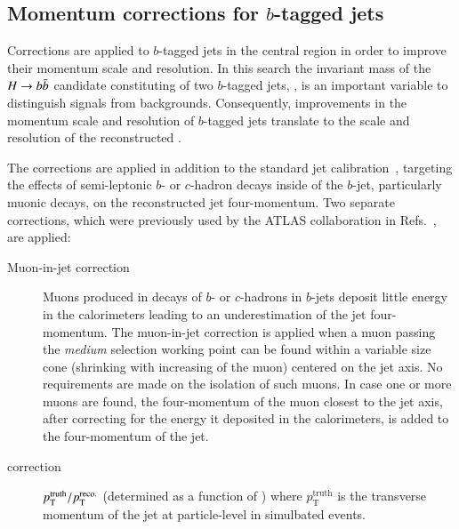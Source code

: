 

\subsection{Momentum corrections for $b$-tagged jets}
\label{sec:bjet_momentum_corrections}

Corrections are applied to $b$-tagged jets in the central region in
order to improve their momentum scale and resolution. In this search
the invariant mass of the $H \to b\bar{b}$ candidate constituting of two
$b$-tagged jets, \mBB, is an important variable to distinguish signals
from backgrounds. Consequently, improvements in the momentum scale and
resolution of $b$-tagged jets translate to the scale and resolution of
the reconstructed \mBB.

The corrections are applied in addition to the standard jet
calibration~\cite{JETM-2018-05}, targeting the effects of
semi-leptonic $b$- or $c$-hadron decays inside of the $b$-jet,
particularly muonic decays, on the reconstructed jet
four-momentum. Two separate corrections, which were
previously used by the ATLAS collaboration in
Refs.~\cite{HIGG-2016-29,HIGG-2018-04,HIGG-2018-51}, are applied:
\begin{description}

\item[Muon-in-jet correction] Muons produced in decays of $b$- or
  $c$-hadrons in $b$-jets deposit little energy in the calorimeters
  leading to an underestimation of the jet four-momentum. The
  muon-in-jet correction is applied when a muon passing the
  \emph{medium} selection working point can be found within a variable
  size cone (shrinking with increasing \pT of the muon) centered on
  the jet axis. No requirements are made on the isolation of such
  muons. In case one or more muons are found, the four-momentum of the
  muon closest to the jet axis, after correcting for the energy it
  deposited in the calorimeters, is added to the four-momentum of the
  jet.

\item[\pTreco correction] $p_{\text{T}}^{\text{truth}} / p_{\text{T}}^{\text{reco.}}$
  (determined as a function of \pTreco) where
  $p_{\text{T}}^{\text{truth}}$ is the transverse momentum of the jet
  at particle-level in simulbated \ttbar events.
\end{description}


